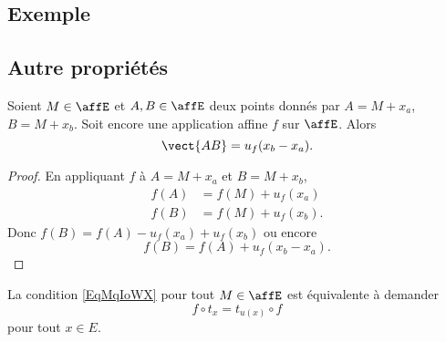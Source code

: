 \subsection{Exemple}



\subsection{Autre propriétés}

\begin{lemma}       \label{LEMooXXTPooKYFGGM}
    Soient \( M\in \affE\) et \( A,B\in \affE\) deux points donnés par \( A=M+x_a\), \( B=M+x_b\). Soit encore une application affine \( f\) sur \( \affE\). Alors
    \begin{equation}
        \vect{ AB }=u_f(x_b-x_a).
    \end{equation}
\end{lemma}

\begin{proof}
    En appliquant \( f\) à \( A=M+x_a\) et \( B=M+x_b\),
    \begin{subequations}
        \begin{align}
            f(A)&=f(M)+u_f(x_a)\\
            f(B)&=f(M)+u_f(x_b).
        \end{align}
    \end{subequations}
    Donc \( f(B)=f(A)-u_f(x_a)+u_f(x_b)\) ou encore
    \begin{equation}
        f(B)=f(A)+u_f(x_b-x_a).
    \end{equation}
\end{proof}

\begin{remark}
    La condition \eqref{EqMqIoWX} pour tout \( M\in\affE\) est équivalente à demander
    \begin{equation}
        f\circ t_x=t_{u(x)}\circ f
    \end{equation}
    pour tout \( x\in E\).
\end{remark}

